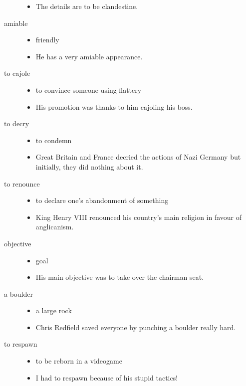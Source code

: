 \documentclass[a4paper]{article}
\begin{document}
\begin{description}
\begin{itemize}
        \item The details are to be clandestine.
    \end{itemize}
    \item[amiable] \begin{itemize}
        \item friendly
        \item He has a very amiable appearance.
    \end{itemize}
    \item[to cajole] \begin{itemize}
        \item to convince someone using flattery
        \item His promotion was thanks to him cajoling his boss.
    \end{itemize}
    \item[to decry] \begin{itemize}
        \item to condemn
        \item Great Britain and France decried the actions of Nazi Germany but initially, they did nothing about it.
    \end{itemize}
    \item[to renounce] \begin{itemize}
        \item to declare one's abandonment of something
        \item King Henry VIII renounced his country's main religion in favour of anglicanism.
    \end{itemize}
    \item[objective] \begin{itemize}
        \item goal
        \item His main objective was to take over the chairman seat.
    \end{itemize}
    \pagebreak
    \item[a boulder] \begin{itemize}
        \item a large rock
        \item Chris Redfield saved everyone by punching a boulder really hard.
    \end{itemize}
    \item[to respawn] \begin{itemize}
        \item to be reborn in a videogame
        \item I had to respawn because of his stupid tactics!

\end{itemize}
\end{description}
\end{document}
